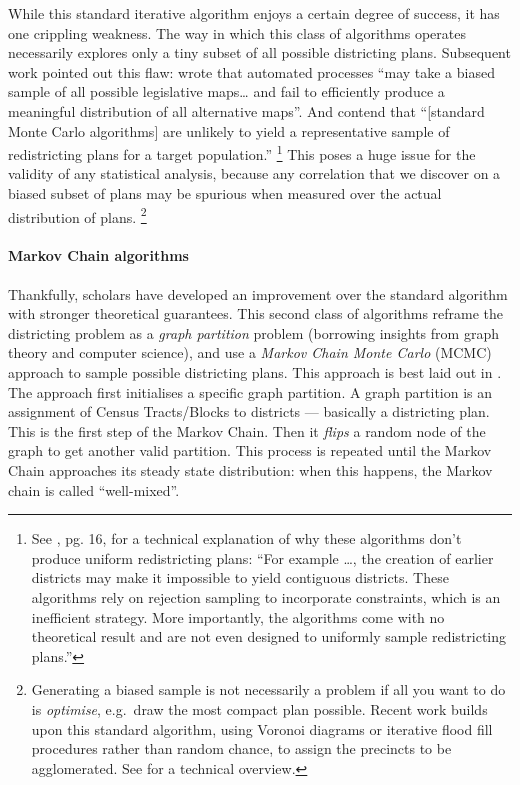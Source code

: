 \documentclass[]{article}
\let\oldparagraph\paragraph
\renewcommand{\paragraph}[1]{\oldparagraph{#1}\mbox{}}
\begin{document}
While this standard iterative algorithm enjoys a certain degree of
success, it has one crippling weakness. The way in which this class of
algorithms operates necessarily explores only a tiny subset of all
possible districting plans. Subsequent work pointed out this flaw:
\citeauthor{mm2018} wrote that automated processes ``may take a biased
sample of all possible legislative maps\ldots{} and fail to efficiently
produce a meaningful distribution of all alternative maps''. And
\citeauthor{fifieldwp} contend that ``{[}standard Monte Carlo
algorithms{]} are unlikely to yield a representative sample of
redistricting plans for a target population.'' \footnote{See
  \cite{fifieldwp}, pg. 16, for a technical explanation of why these
  algorithms don't produce uniform redistricting plans: ``For example
  \ldots{}, the creation of earlier districts may make it impossible to
  yield contiguous districts. These algorithms rely on rejection
  sampling to incorporate constraints, which is an inefficient strategy.
  More importantly, the algorithms come with no theoretical result and
  are not even designed to uniformly sample redistricting plans.''} This
poses a huge issue for the validity of any statistical analysis, because
any correlation that we discover on a biased subset of plans may be
spurious when measured over the actual distribution of plans. \footnote{Generating
  a biased sample is not necessarily a problem if all you want to do is
  \emph{optimise}, e.g.~draw the most compact plan possible. Recent work
  builds upon this standard algorithm, using Voronoi diagrams or
  iterative flood fill procedures rather than random chance, to assign
  the precincts to be agglomerated. See \cite{lf2019} for a technical
  overview.}

\hypertarget{markov-chain-algorithms}{%
\paragraph{Markov Chain algorithms}\label{markov-chain-algorithms}}

Thankfully, scholars have developed an improvement over the standard
algorithm with stronger theoretical guarantees. This second class of
algorithms reframe the districting problem as a \emph{graph partition}
problem (borrowing insights from graph theory and computer science), and
use a \emph{Markov Chain Monte Carlo} (MCMC) approach to sample possible
districting plans. This approach is best laid out in \cite{fifieldwp}.
The approach first initialises a specific graph partition. A graph
partition is an assignment of Census Tracts/Blocks to districts ---
basically a districting plan. This is the first step of the Markov
Chain. Then it \emph{flips} a random node of the graph to get another
valid partition. This process is repeated until the Markov Chain
approaches its steady state distribution: when this happens, the Markov
chain is called ``well-mixed''.
\end{document}
